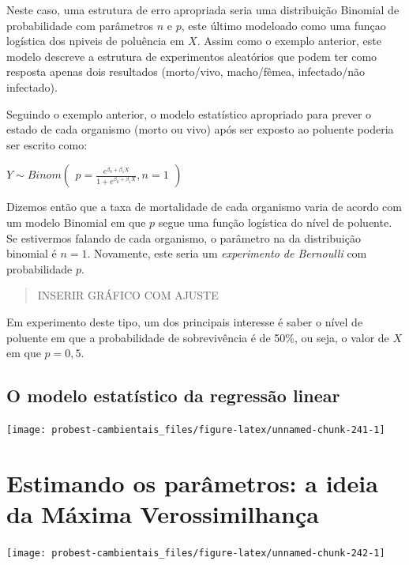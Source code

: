 \documentclass[
]{book}
\begin{document}
Neste caso, uma estrutura de erro apropriada seria uma distribuição Binomial de probabilidade com parâmetros \(n\) e \(p\), este último modeloado como uma funçao logística dos npiveis de poluência em \(X\). Assim como o exemplo anterior, este modelo descreve a estrutura de experimentos aleatórios que podem ter como resposta apenas dois resultados (morto/vivo, macho/fêmea, infectado/não infectado).

Seguindo o exemplo anterior, o modelo estatístico apropriado para prever o estado de cada organismo (morto ou vivo) após ser exposto ao poluente poderia ser escrito como:

\(Y ∼ Binom \left (\begin{array}{c} p = \frac{e^{\beta_0 + \beta_1 X}}{1 + e^{\beta_0 + \beta_1 X}}, n = 1 \end{array}\right)\)

Dizemos então que a taxa de mortalidade de cada organismo varia de acordo com um modelo Binomial em que \(p\) segue uma função logística do nível de poluente. Se estivermos falando de cada organismo, o parâmetro na da distribuição binomial é \(n = 1\). Novamente, este seria um \emph{experimento de Bernoulli} com probabilidade \(p\).

\begin{quote}
INSERIR GRÁFICO COM AJUSTE
\end{quote}

Em experimento deste tipo, um dos principais interesse é saber o nível de poluente em que a probabilidade de sobrevivência é de 50\%, ou seja, o valor de \(X\) em que \(p = 0,5\).

\hypertarget{o-modelo-estatuxedstico-da-regressuxe3o-linear}{%
\section{O modelo estatístico da regressão linear}\label{o-modelo-estatuxedstico-da-regressuxe3o-linear}}

\begin{center}\texttt{[image: probest-cambientais\_files/figure-latex/unnamed-chunk-241-1]} \end{center}

\hypertarget{emv}{%
\chapter{Estimando os parâmetros: a ideia da Máxima Verossimilhança}\label{emv}}

\begin{center}\texttt{[image: probest-cambientais\_files/figure-latex/unnamed-chunk-242-1]} \end{center}
\end{document}
